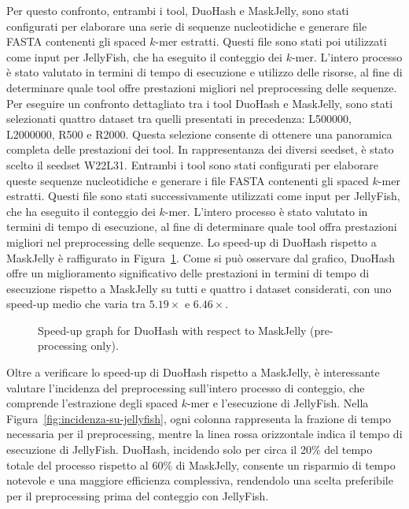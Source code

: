 Per questo confronto, entrambi i tool, DuoHash e MaskJelly, sono stati configurati per elaborare una serie di sequenze nucleotidiche e generare file FASTA contenenti gli spaced $k$-mer estratti. Questi file sono stati poi utilizzati come input per JellyFish, che ha eseguito il conteggio dei $k$-mer. L'intero processo è stato valutato in termini di tempo di esecuzione e utilizzo delle risorse, al fine di determinare quale tool offre prestazioni migliori nel preprocessing delle sequenze. Per eseguire un confronto dettagliato tra i tool DuoHash e MaskJelly, sono stati selezionati quattro dataset tra quelli presentati in precedenza: L500000, L2000000, R500 e R2000. Questa selezione consente di ottenere una panoramica completa delle prestazioni dei tool. In rappresentanza dei diversi seedset, è stato scelto il seedset W22L31. Entrambi i tool sono stati configurati per elaborare queste sequenze nucleotidiche e generare i file FASTA contenenti gli spaced $k$-mer estratti. Questi file sono stati successivamente utilizzati come input per JellyFish, che ha eseguito il conteggio dei $k$-mer. L'intero processo è stato valutato in termini di tempo di esecuzione, al fine di determinare quale tool offra prestazioni migliori nel preprocessing delle sequenze. Lo speed-up di DuoHash rispetto a MaskJelly è raffigurato in Figura~\ref{fig:speedup-preprocessing}. Come si può osservare dal grafico, DuoHash offre un miglioramento significativo delle prestazioni in termini di tempo di esecuzione rispetto a MaskJelly su tutti e quattro i dataset considerati, con uno speed-up medio che varia tra $5.19\times$ e $6.46\times$.

\begin{figure}[!ht]
	\centering
	\caption{Speed-up graph for DuoHash with respect to MaskJelly (pre-processing only).}
	\label{fig:speedup-preprocessing}
\end{figure}

Oltre a verificare lo speed-up di DuoHash rispetto a MaskJelly, è interessante valutare l'incidenza del preprocessing sull'intero processo di conteggio, che comprende l'estrazione degli spaced $k$-mer e l'esecuzione di JellyFish. Nella Figura~\ref{fig:incidenza-su-jellyfish}, ogni colonna rappresenta la frazione di tempo necessaria per il preprocessing, mentre la linea rossa orizzontale indica il tempo di esecuzione di JellyFish. DuoHash, incidendo solo per circa il 20\% del tempo totale del processo rispetto al 60\% di MaskJelly, consente un risparmio di tempo notevole e una maggiore efficienza complessiva, rendendolo una scelta preferibile per il preprocessing prima del conteggio con JellyFish.


